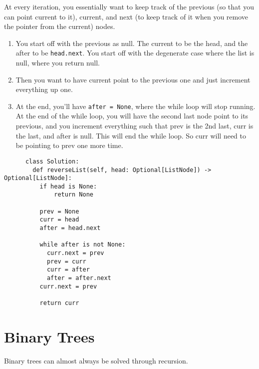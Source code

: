 \documentclass{article}
\begin{document}
  \begin{theorem}
    At every iteration, you essentially want to keep track of the previous (so that you can point current to it), current, and next (to keep track of it when you remove the pointer from the current) nodes. 
    \begin{enumerate}
      \item You start off with the previous as null. The current to be the head, and the after to be \texttt{head.next}. You start off with the degenerate case where the list is null, where you return null. 
      \item Then you want to have current point to the previous one and just increment everything up one. 
      \item At the end, you'll have \texttt{after = None}, where the while loop will stop running. At the end of the while loop, you will have the second last node point to its previous, and you increment everything such that prev is the 2nd last, curr is the last, and after is null. This will end the while loop. So curr will need to be pointing to prev one more time. 
    \end{enumerate}
    \begin{lstlisting}
      class Solution:
        def reverseList(self, head: Optional[ListNode]) -> Optional[ListNode]:
          if head is None: 
              return None 

          prev = None 
          curr = head 
          after = head.next 
          
          while after is not None: 
            curr.next = prev 
            prev = curr 
            curr = after 
            after = after.next
          curr.next = prev 

          return curr
    \end{lstlisting} 
  \end{theorem}

\section{Binary Trees}

  Binary trees can almost always be solved through recursion. 
\end{document}
